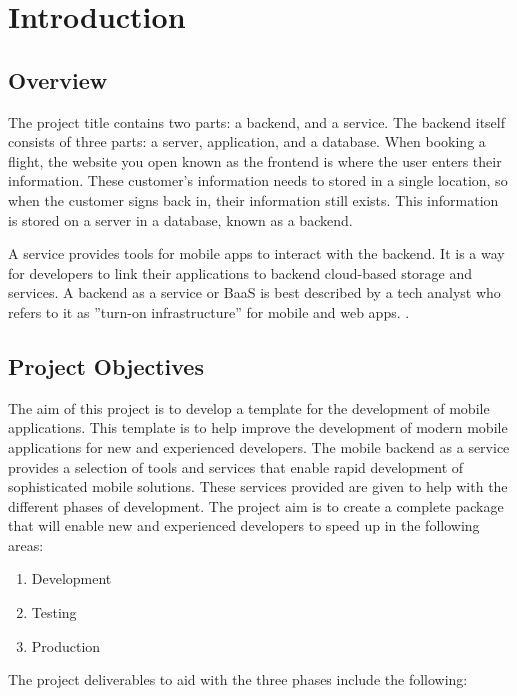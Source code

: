 \chapter{Introduction}

\section{Overview}

The project title contains two parts: a backend, and a service. The backend itself consists of three parts: a server, application, and a database. When booking a flight, the website you open known as the frontend is where the user enters their information. These customer’s information needs to stored in a single location, so when the customer signs back in, their information still exists. This information is stored on a server in a database, known as a backend.

A service provides tools for mobile apps to interact with the backend. It is a way for developers to link their applications to backend cloud-based storage and services. A backend as a service or BaaS is best described by a tech analyst who refers to it as ”turn-on infrastructure” for mobile and web apps. \cite{kinveywebsite}.

\section{Project Objectives}
The aim of this project is to develop a template for the development of mobile applications. This template is to help improve the development of modern mobile applications for new and experienced developers. The mobile backend as a service provides a selection of tools and services that enable rapid development of sophisticated mobile solutions. These services provided are given to help with the different phases of development. The project aim is to create a complete package that will enable new and experienced developers to speed up in the following areas:

\begin{enumerate}
  \item Development
  \item Testing 
  \item Production
\end{enumerate}

The project deliverables to aid with the three phases include the following:

